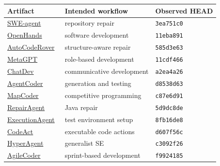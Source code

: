 \begin{tabularx}{\textwidth}{lXl}
\toprule Artifact & Intended workflow & Observed HEAD \\
\midrule
\href{https://github.com/SWE-agent/SWE-agent}{SWE-agent}~\cite{yang2024sweagent} & repository repair & \texttt{3ea751c0} \\
\href{https://github.com/OpenHands/OpenHands}{OpenHands}~\cite{wang2025openhands} & software development & \texttt{11eba891} \\
\href{https://github.com/AutoCodeRoverSG/auto-code-rover}{AutoCodeRover}~\cite{resaiartifact3} & structure-aware repair & \texttt{585d3e63} \\
\href{https://github.com/FoundationAgents/MetaGPT}{MetaGPT}~\cite{resaiartifact4} & role-based development & \texttt{11cdf466} \\
\href{https://github.com/OpenBMB/ChatDev}{ChatDev}~\cite{resaiartifact5} & communicative development & \texttt{a2ea4a26} \\
\href{https://github.com/huangd1999/AgentCoder}{AgentCoder}~\cite{resaiartifact6} & generation and testing & \texttt{d8538d63} \\
\href{https://github.com/Md-Ashraful-Pramanik/MapCoder}{MapCoder}~\cite{resaiartifact7} & competitive programming & \texttt{c87e6d91} \\
\href{https://github.com/sola-st/RepairAgent}{RepairAgent}~\cite{resaiartifact8} & Java repair & \texttt{5d9dc8de} \\
\href{https://github.com/sola-st/ExecutionAgent}{ExecutionAgent}~\cite{bouzenia2025executionagent} & test environment setup & \texttt{8fb16de8} \\
\href{https://github.com/xingyaoww/code-act}{CodeAct}~\cite{resaiartifact10} & executable code actions & \texttt{d607f56c} \\
\href{https://github.com/FSoft-AI4Code/HyperAgent}{HyperAgent}~\cite{resaiartifact11} & generalist SE & \texttt{c3092f26} \\
\href{https://github.com/FSoft-AI4Code/AgileCoder}{AgileCoder}~\cite{resaiartifact12} & sprint-based development & \texttt{f9924185} \\
\bottomrule
\end{tabularx}
